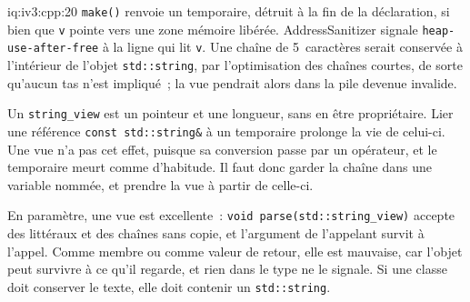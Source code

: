 \begin{solution}{iq:iv3:cpp:20}
\texttt{make()} renvoie un temporaire, détruit à la fin de la déclaration, si bien que \texttt{v} pointe vers une zone mémoire libérée. AddressSanitizer signale \texttt{heap-use-after-free} à la ligne qui lit \texttt{v}. Une chaîne de 5~caractères serait conservée à l'intérieur de l'objet \texttt{std::string}, par l'optimisation des chaînes courtes, de sorte qu'aucun tas n'est impliqué~; la vue pendrait alors dans la pile devenue invalide.

Un \texttt{string\_view} est un pointeur et une longueur, sans en être propriétaire. Lier une référence \texttt{const std::string\&} à un temporaire prolonge la vie de celui-ci. Une vue n'a pas cet effet, puisque sa conversion passe par un opérateur, et le temporaire meurt comme d'habitude. Il faut donc garder la chaîne dans une variable nommée, et prendre la vue à partir de celle-ci.

En paramètre, une vue est excellente~: \texttt{void parse(std::string\_view)} accepte des littéraux et des chaînes sans copie, et l'argument de l'appelant survit à l'appel. Comme membre ou comme valeur de retour, elle est mauvaise, car l'objet peut survivre à ce qu'il regarde, et rien dans le type ne le signale. Si une classe doit conserver le texte, elle doit contenir un \texttt{std::string}.

\end{solution}

